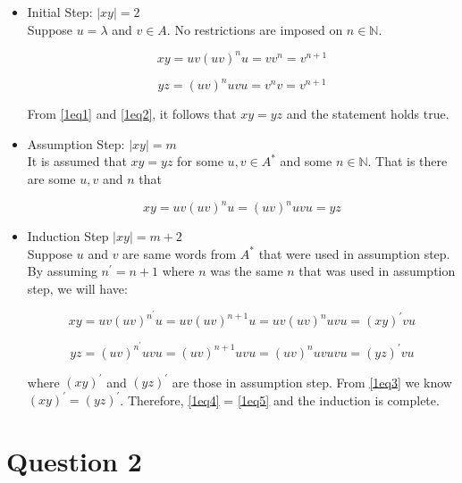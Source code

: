 \begin{itemize}

	\item
	Initial Step: $|xy| = 2$\\
	Suppose $u = \lambda$ and $v \in A$. No restrictions are imposed on $n \in \mathbb{N}$.

	\begin{equation}\label{1eq1}
	xy = uv(uv)^nu = vv^n = v^{n+1}
	\end{equation}

	\begin{equation}\label{1eq2}
	yz = (uv)^nuvu = v^nv = v^{n+1}
	\end{equation}

	From \eqref{1eq1} and \eqref{1eq2}, it follows that $xy = yz$ and the statement holds true.

	\item
	Assumption Step: $|xy| = m$\\
	It is assumed that $xy = yz$ for some $u,v \in A^*$ and some $n \in \mathbb{N}$.
	That is there are some $u, v$ and $n$ that

	\begin{equation}\label{1eq3}
	xy = uv(uv)^nu = (uv)^nuvu = yz
	\end{equation}

	\item
	Induction Step $|xy| = m + 2$\\
	Suppose $u$ and $v$ are same words from $A^*$ that were used in assumption step.
	By assuming $n^\prime = n + 1$ where $n$ was the same $n$ that was used in assumption step, we will have:

	\begin{equation}\label{1eq4}
	xy = uv(uv)^{n^\prime}u = uv(uv)^{n+1}u = uv(uv)^nuvu = (xy)^\prime vu
	\end{equation}

	\begin{equation}\label{1eq5}
	yz = (uv)^{n^\prime}uvu = (uv)^{n+1}uvu = (uv)^nuvuvu = (yz)^\prime vu
	\end{equation}

	where $(xy)^\prime$ and $(yz)^\prime$ are those in assumption step.
	From \eqref{1eq3} we know $(xy)^\prime = (yz)^\prime$. Therefore, \eqref{1eq4} = \eqref{1eq5} and the induction is complete.

\end{itemize}

\section{Question 2}

